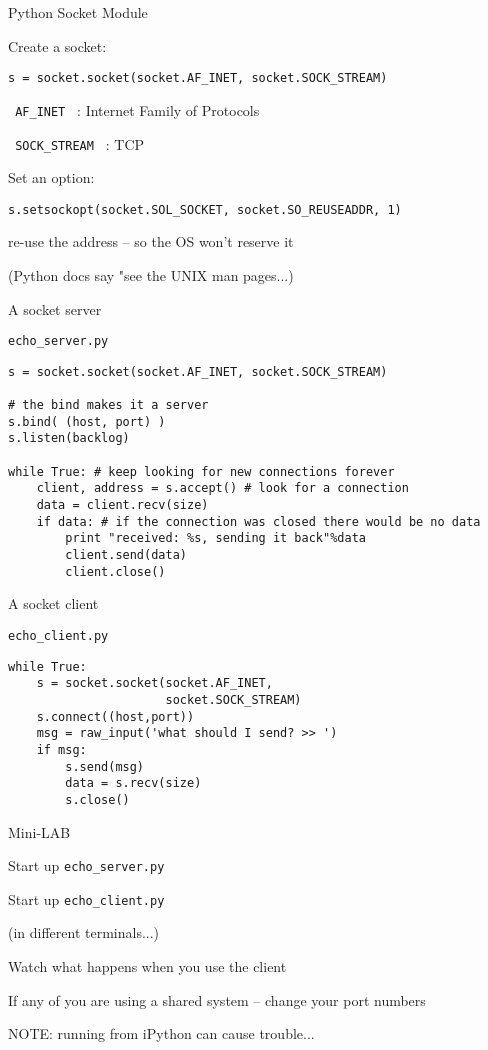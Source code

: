 \documentclass{beamer}
\begin{document}
\begin{frame}[fragile]{Python Socket Module}

{\Large Create a socket:}
\begin{verbatim}
s = socket.socket(socket.AF_INET, socket.SOCK_STREAM)
\end{verbatim}
\verb| AF_INET | : Internet Family of Protocols

\verb| SOCK_STREAM | : TCP

\vfill
{\Large Set an option:}
\begin{verbatim}
s.setsockopt(socket.SOL_SOCKET, socket.SO_REUSEADDR, 1)  
\end{verbatim}
 re-use the address -- so the OS won't reserve it

\vfill
(Python docs say "see the UNIX man pages...)
\end{frame}

\begin{frame}[fragile]{A socket server}

{\Large \verb|echo_server.py|}
\begin{verbatim}
s = socket.socket(socket.AF_INET, socket.SOCK_STREAM) 

# the bind makes it a server
s.bind( (host, port) ) 
s.listen(backlog) 

while True: # keep looking for new connections forever
    client, address = s.accept() # look for a connection
    data = client.recv(size)
    if data: # if the connection was closed there would be no data
        print "received: %s, sending it back"%data
        client.send(data) 
        client.close()
\end{verbatim}
\end{frame}

\begin{frame}[fragile]{A socket client}

{\Large \verb|echo_client.py|}
\begin{verbatim}
while True:
    s = socket.socket(socket.AF_INET, 
                      socket.SOCK_STREAM) 
    s.connect((host,port)) 
    msg = raw_input('what should I send? >> ')
    if msg:
        s.send(msg) 
        data = s.recv(size) 
        s.close() 
\end{verbatim}
\end{frame}

\begin{frame}[fragile]{Mini-LAB}

{\Large Start up \verb|echo_server.py|}

\vfill
{\Large Start up \verb|echo_client.py|}

\vfill
(in different terminals...)

\vfill
{\Large Watch what happens when you use the client}

\vfill
If any of you are using a shared system -- change your port numbers

NOTE: running from iPython can cause trouble...
\end{frame}
\end{document}
